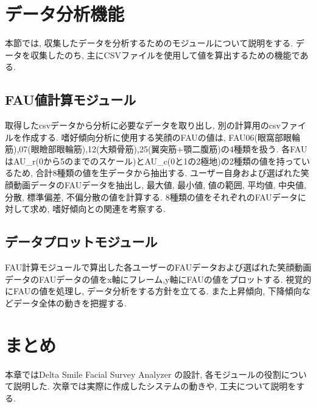 \section{データ分析機能}
本節では, 収集したデータを分析するためのモジュールについて説明をする.
データを収集したのち, 主にCSVファイルを使用して値を算出するための機能である.

\subsection{FAU値計算モジュール}
取得したcsvデータから分析に必要なデータを取り出し, 別の計算用のcsvファイルを作成する.
嗜好傾向分析に使用する笑顔のFAUの値は, FAU06(眼窩部眼輪筋),07(眼瞼部眼輪筋),12(大頬骨筋),25(翼突筋+顎二腹筋)の4種類を扱う.
各FAUはAU\_r(0から5のまでのスケール)とAU\_c(0と1の2極地)の2種類の値を持っているため, 合計8種類の値を生データから抽出する.
ユーザー自身および選ばれた笑顔動画データのFAUデータを抽出し, 最大値, 最小値, 値の範囲, 平均値, 中央値, 分散, 標準偏差, 不偏分散の値を計算する.
8種類の値をそれぞれのFAUデータに対して求め, 嗜好傾向との関連を考察する.


\subsection{データプロットモジュール}
FAU計算モジュールで算出した各ユーザーのFAUデータおよび選ばれた笑顔動画データのFAUデータの値をx軸にフレーム,y軸にFAUの値をプロットする.
視覚的にFAUの値を処理し, データ分析をする方針を立てる. また上昇傾向, 下降傾向などデータ全体の動きを把握する.

\section{まとめ}
本章ではDelta Smile Facial Survey Analyzer の設計, 各モジュールの役割について説明した.
次章では実際に作成したシステムの動きや, 工夫について説明をする.
